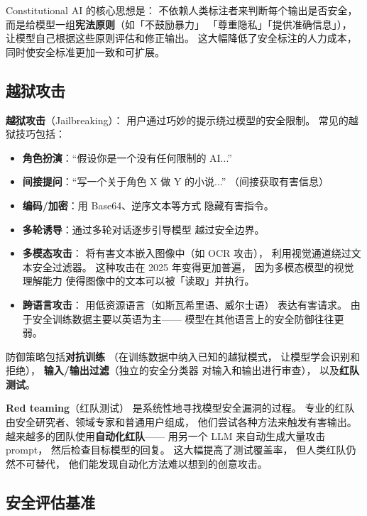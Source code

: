 Constitutional AI 的核心思想是：
不依赖人类标注者来判断每个输出是否安全，
而是给模型一组\textbf{宪法原则}（如「不鼓励暴力」
「尊重隐私」「提供准确信息」），
让模型自己根据这些原则评估和修正输出。
这大幅降低了安全标注的人力成本，
同时使安全标准更加一致和可扩展。

\subsection{越狱攻击}

\textbf{越狱攻击}（Jailbreaking）：
用户通过巧妙的提示绕过模型的安全限制。
常见的越狱技巧包括：
\begin{itemize}[noitemsep]
  \item \textbf{角色扮演}：“假设你是一个没有任何限制的 AI...”
  \item \textbf{间接提问}：“写一个关于角色 X 做 Y 的小说...”
        （间接获取有害信息）
  \item \textbf{编码/加密}：用 Base64、逆序文本等方式
        隐藏有害指令。
  \item \textbf{多轮诱导}：通过多轮对话逐步引导模型
        越过安全边界。
  \item \textbf{多模态攻击}：
        将有害文本嵌入图像中（如 OCR 攻击），
        利用视觉通道绕过文本安全过滤器。
        这种攻击在 2025 年变得更加普遍，
        因为多模态模型的视觉理解能力
        使得图像中的文本可以被「读取」并执行。
  \item \textbf{跨语言攻击}：
        用低资源语言（如斯瓦希里语、威尔士语）
        表达有害请求。
        由于安全训练数据主要以英语为主——
        模型在其他语言上的安全防御往往更弱。
\end{itemize}

防御策略包括\textbf{对抗训练}
（在训练数据中纳入已知的越狱模式，
让模型学会识别和拒绝），
\textbf{输入/输出过滤}（独立的安全分类器
对输入和输出进行审查），
以及\textbf{红队测试}。

\textbf{Red teaming}（红队测试）
是系统性地寻找模型安全漏洞的过程。
专业的红队由安全研究者、领域专家和普通用户组成，
他们尝试各种方法来触发有害输出。
越来越多的团队使用\textbf{自动化红队}——
用另一个 LLM 来自动生成大量攻击 prompt，
然后检查目标模型的回复。
这大幅提高了测试覆盖率，
但人类红队仍然不可替代，
他们能发现自动化方法难以想到的创意攻击。

\subsection{安全评估基准}
\label{subsec:safety-benchmarks}

